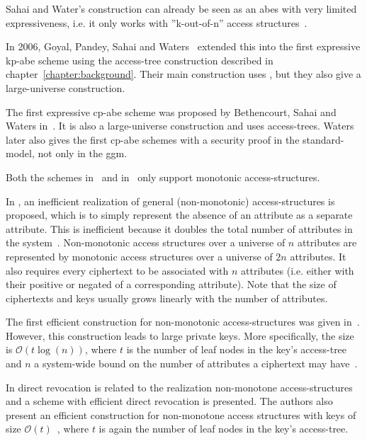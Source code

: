 Sahai and Water's construction can already be seen as an \acrshort{abes} with very limited expressiveness, i.e. it only works with ''k-out-of-n'' access structures~\cite{goyal_attribute-based_2006}.

In 2006, Goyal, Pandey, Sahai and Waters~\cite{goyal_attribute-based_2006} extended this into the first expressive \acrshort{kp-abe} scheme using the \gls{access-tree} construction described in chapter~\ref{chapter:background}.
Their main construction uses , but they also give a \gls{large-universe} construction.

The first expressive \acrshort{cp-abe} scheme was proposed by Bethencourt, Sahai and Waters in~\cite{bethencourt_ciphertext-policy_2007}.
It is also a large-universe construction and uses \glspl{access-tree}.
Waters \cite{waters_ciphertext-policy_2011} later also gives the first \acrshort{cp-abe} schemes with a security proof in the \gls{standard-model}, not only in the \gls{ggm}.

Both the schemes in~\cite{goyal_attribute-based_2006} and in~\cite{bethencourt_ciphertext-policy_2007} only support monotonic \glspl{access-structure}.

In \cite{goyal_attribute-based_2006}, an inefficient realization of general (non-monotonic) \glspl{access-structure} is proposed, which is to simply represent the absence of an attribute as a separate attribute.
This is inefficient because it doubles the total number of attributes in the system~\cite{goyal_attribute-based_2006}. 
Non-monotonic access structures over a universe of $n$ attributes are represented by monotonic access structures over a universe of $2n$ attributes.
It also requires every ciphertext to be associated with $n$ attributes (i.e. either with their positive or negated of a corresponding attribute).
Note that the size of ciphertexts and keys usually grows linearly with the number of attributes.

The first efficient construction for non-monotonic \glspl{access-structure} was given in~\cite{ostrovsky_attribute-based_2007}. 
However, this construction leads to large private keys.
More specifically, the size is $\mathcal{O}(t \log(n))$, where $t$ is the number of leaf nodes in the key's \gls{access-tree} and $n$ a system-wide bound on the number of attributes a ciphertext may have~\cite{lewko_revocation_2008}.

In \cite{lewko_revocation_2008} direct revocation is related to the realization non-monotone \glspl{access-structure} and a scheme with efficient direct revocation is presented.
The authors also present an efficient construction for non-monotone access structures with keys of size $\mathcal{O}(t)$~\cite{lewko_revocation_2008}, where $t$ is again the number of leaf nodes in the key's \gls{access-tree}.

